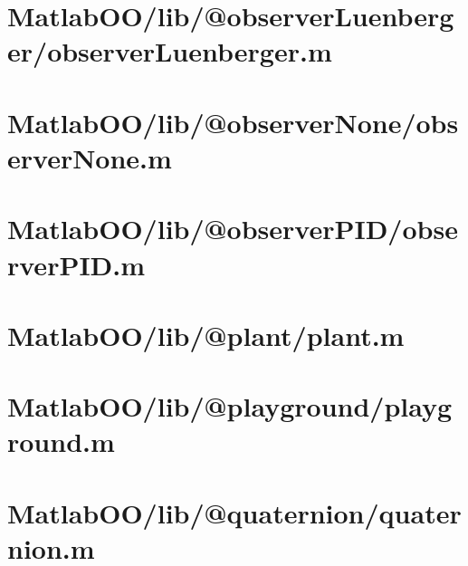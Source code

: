 \pagebreak
\section{MatlabOO/lib/@observerLuenberger/observerLuenberger.m}\label{code:MatlabOO/lib/@observerLuenberger/observerLuenberger.m}


\pagebreak
\section{MatlabOO/lib/@observerNone/observerNone.m}\label{code:MatlabOO/lib/@observerNone/observerNone.m}


\pagebreak
\section{MatlabOO/lib/@observerPID/observerPID.m}\label{code:MatlabOO/lib/@observerPID/observerPID.m}


\pagebreak
\section{MatlabOO/lib/@plant/plant.m}\label{code:MatlabOO/lib/@plant/plant.m}


\pagebreak
\section{MatlabOO/lib/@playground/playground.m}\label{code:MatlabOO/lib/@playground/playground.m}


\pagebreak
\section{MatlabOO/lib/@quaternion/quaternion.m}\label{code:MatlabOO/lib/@quaternion/quaternion.m}


